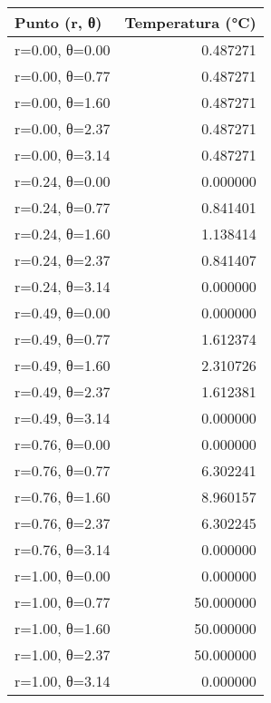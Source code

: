 \begin{tabular}{lr}
\toprule
Punto (r, θ) & Temperatura (°C) \\
\midrule
r=0.00, θ=0.00 & 0.487271 \\
r=0.00, θ=0.77 & 0.487271 \\
r=0.00, θ=1.60 & 0.487271 \\
r=0.00, θ=2.37 & 0.487271 \\
r=0.00, θ=3.14 & 0.487271 \\
r=0.24, θ=0.00 & 0.000000 \\
r=0.24, θ=0.77 & 0.841401 \\
r=0.24, θ=1.60 & 1.138414 \\
r=0.24, θ=2.37 & 0.841407 \\
r=0.24, θ=3.14 & 0.000000 \\
r=0.49, θ=0.00 & 0.000000 \\
r=0.49, θ=0.77 & 1.612374 \\
r=0.49, θ=1.60 & 2.310726 \\
r=0.49, θ=2.37 & 1.612381 \\
r=0.49, θ=3.14 & 0.000000 \\
r=0.76, θ=0.00 & 0.000000 \\
r=0.76, θ=0.77 & 6.302241 \\
r=0.76, θ=1.60 & 8.960157 \\
r=0.76, θ=2.37 & 6.302245 \\
r=0.76, θ=3.14 & 0.000000 \\
r=1.00, θ=0.00 & 0.000000 \\
r=1.00, θ=0.77 & 50.000000 \\
r=1.00, θ=1.60 & 50.000000 \\
r=1.00, θ=2.37 & 50.000000 \\
r=1.00, θ=3.14 & 0.000000 \\
\bottomrule
\end{tabular}
